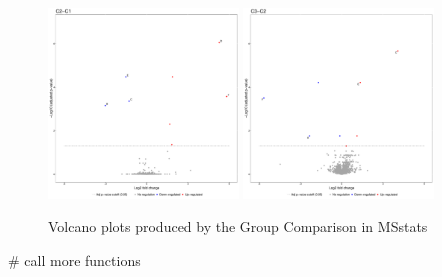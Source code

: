 \begin{figure}[htbp]
	\centering
	\includegraphics[width=0.45\textwidth]{graphics/labelfree/msstats/c2_c1.pdf}
	\qquad
	\includegraphics[width=0.45\textwidth]{graphics/labelfree/msstats/c3_c2.pdf}
	\caption{Volcano plots produced by the Group Comparison in MSstats}
	\label{fig:msstats_1}
\end{figure}


# call more functions









